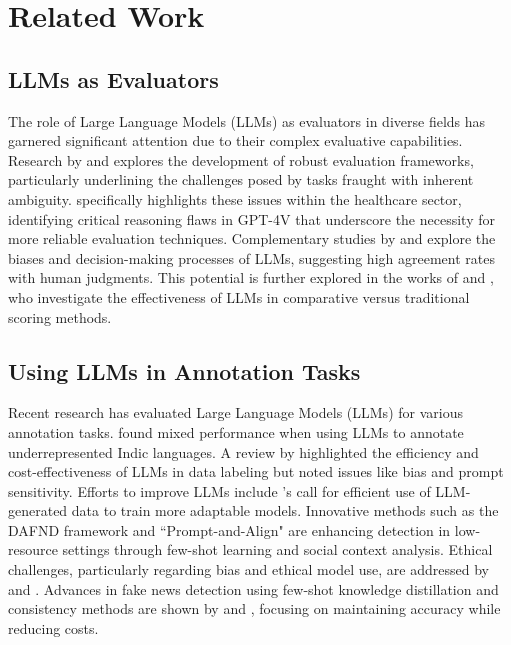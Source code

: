 \section{Related Work}
\subsection{LLMs as Evaluators}
The role of Large Language Models (LLMs) as evaluators in diverse fields has garnered significant attention due to their complex evaluative capabilities. Research by \cite{laskar2024survey} and \cite{saxon2024framework} explores the development of robust evaluation frameworks, particularly underlining the challenges posed by tasks fraught with inherent ambiguity. \cite{jin2024gpt4v} specifically highlights these issues within the healthcare sector, identifying critical reasoning flaws in GPT-4V that underscore the necessity for more reliable evaluation techniques. Complementary studies by \cite{thakur2024judgingjudgesevaluatingalignment} and \cite{10.5555/3666122.3668142} explore the biases and decision-making processes of LLMs, suggesting high agreement rates with human judgments. This potential is further explored in the works of \cite{dong2024llmpersonalizedjudge} and \cite{liusie2024llmcomparativeassessmentzeroshot}, who investigate the effectiveness of LLMs in comparative versus traditional scoring methods.

\subsection{Using LLMs in Annotation Tasks}
Recent research has evaluated Large Language Models (LLMs) for various annotation tasks. \cite{bhat-varma-2023-large} found mixed performance when using LLMs to annotate underrepresented Indic languages. A review by \cite{pavlovic-poesio-2024-effectiveness} highlighted the efficiency and cost-effectiveness of LLMs in data labeling but noted issues like bias and prompt sensitivity. Efforts to improve LLMs include \cite{tamang2024evaluating}'s call for efficient use of LLM-generated data to train more adaptable models. Innovative methods such as the DAFND framework \cite{liu2024dafnd} and ``Prompt-and-Align" \cite{wu2023promptalign} are enhancing detection in low-resource settings through few-shot learning and social context analysis. Ethical challenges, particularly regarding bias and ethical model use, are addressed by \cite{fan2024subjective} and \cite{bender2021parrots}. Advances in fake news detection using few-shot knowledge distillation and consistency methods are shown by \cite{springer2023fskd} and \cite{nature2024consistency}, focusing on maintaining accuracy while reducing costs.

